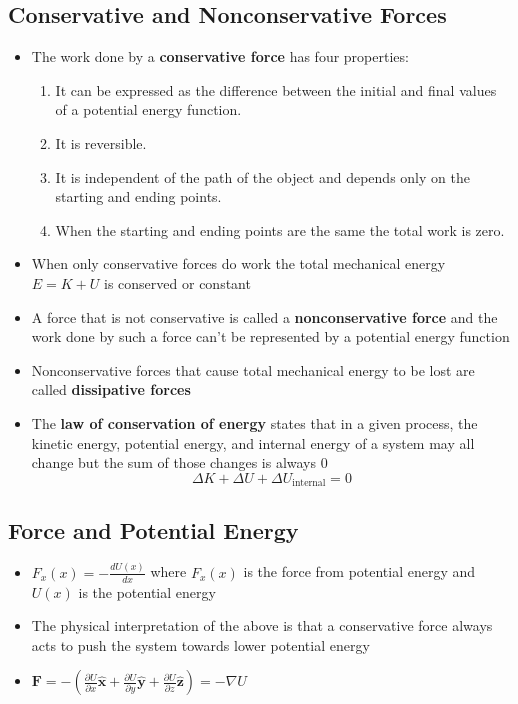 \documentclass{article}
\begin{document}
\subsection{Conservative and Nonconservative Forces}

\begin{itemize}
\item The work done by a \textbf{conservative force} has four properties:

\begin{enumerate}
  \item It can be expressed as the difference between the initial and final values of a potential energy function.

  \item It is reversible.

  \item It is independent of the path of the object and depends only on the starting and ending points.

  \item When the starting and ending points are the same the total work is zero.
\end{enumerate}

\item When only conservative forces do work the total mechanical energy $E=K+U$ is conserved or constant

\item A force that is not conservative is called a \textbf{nonconservative force} and the work done by such a force can't be represented by a potential energy function

\item Nonconservative forces that cause total mechanical energy to be lost are called \textbf{dissipative forces}

\item The \textbf{law of conservation of energy} states that in a given process, the kinetic energy, potential energy, and internal energy of a system may all change but the sum of those changes is always 0 \[\Delta K + \Delta U + \Delta U_\textrm{internal} = 0\]
\end {itemize}

\subsection{Force and Potential Energy}

\begin{itemize}
  \item $F_x(x)=-\frac{dU(x)}{dx}$ where $F_x(x)$ is the force from potential energy and $U(x)$ is the potential energy

  \item The physical interpretation of the above is that a conservative force always acts to push the system towards lower potential energy

  \item $\textbf{F} = -\left(\frac{\partial U}{\partial x} \hat{\mathbf{x}} + \frac{\partial U}{\partial y} \hat{\mathbf{y}} + \frac{\partial U}{\partial z} \hat{\mathbf{z}}\right)= -\nabla U$
\end{itemize}
\end{document}
